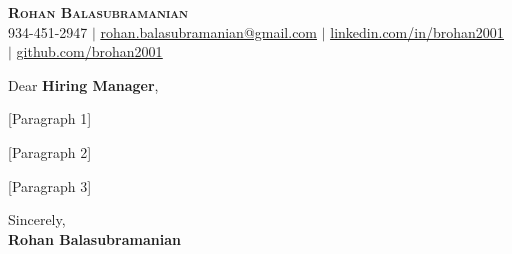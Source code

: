 \documentclass[letterpaper,11pt]{article}
\begin{document}
\begin{center}
    \textbf{\Huge \scshape Rohan Balasubramanian} \\ \vspace{1pt}
    \small 934-451-2947 $|$ 
    \href{mailto:rohan.balasubramanian@gmail.com}{\underline{rohan.balasubramanian@gmail.com}} $|$ 
    \href{https://www.linkedin.com/in/brohan2001/}{\underline{linkedin.com/in/brohan2001}} $|$
    \href{https://github.com/brohan2001}{\underline{github.com/brohan2001}}
\end{center}

\vspace{1 cm}

Dear \textbf{Hiring Manager},

\vspace{0.3cm}

[Paragraph 1]
\vspace{0.3cm}

[Paragraph 2]

\vspace{0.3cm}

[Paragraph 3]

\vspace{0.5cm}

Sincerely, \\[6pt]
\textbf{Rohan Balasubramanian}
\end{document}
